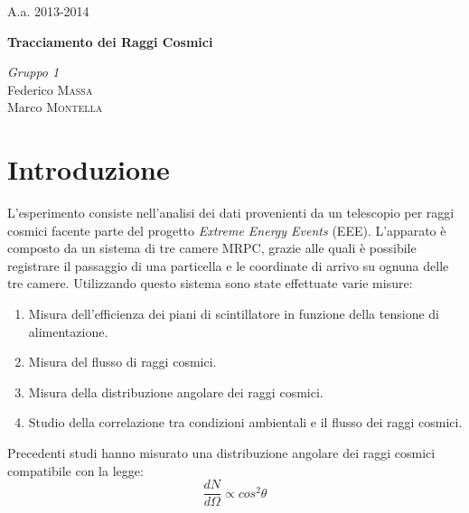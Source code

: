 \documentclass[8pt]{extarticle}
\begin{document}
\justify
\printindex
\Large{A.a. 2013-2014}
\vspace{10cm}
\begin{center}
\Huge\textbf{Tracciamento dei Raggi Cosmici}
\end{center}

\vspace{2cm}
\begin{flushleft}
\textit{Gruppo \textsc{1}} \\
\medskip
Federico \textsc{Massa} \\ 
Marco \textsc{Montella}
\end{flushleft}



\newpage

\begin{abstract}
\justify
 

\end{abstract}
\bigskip

\section{Introduzione}
L'esperimento consiste nell'analisi dei dati provenienti da un telescopio per raggi cosmici facente parte del progetto \textit{Extreme Energy Events} (EEE). L'apparato è composto da un sistema di tre camere MRPC, grazie alle quali è possibile registrare il passaggio di una particella e le coordinate di arrivo su ognuna delle tre camere. Utilizzando questo sistema sono state effettuate varie misure: \\

\begin{enumerate}
\item Misura dell'efficienza dei piani di scintillatore in funzione della tensione di alimentazione.
\item Misura del flusso di raggi cosmici.
\item Misura della distribuzione angolare dei raggi cosmici.
\item Studio della correlazione tra condizioni ambientali e il flusso dei raggi cosmici.
\end{enumerate}

Precedenti studi\cite{cos2} hanno misurato una distribuzione angolare dei raggi cosmici compatibile con la legge: \\

\begin{equation}
\frac{dN}{d\Omega} \propto cos^2 \theta
\nonumber
\end{equation}
\end{document}
